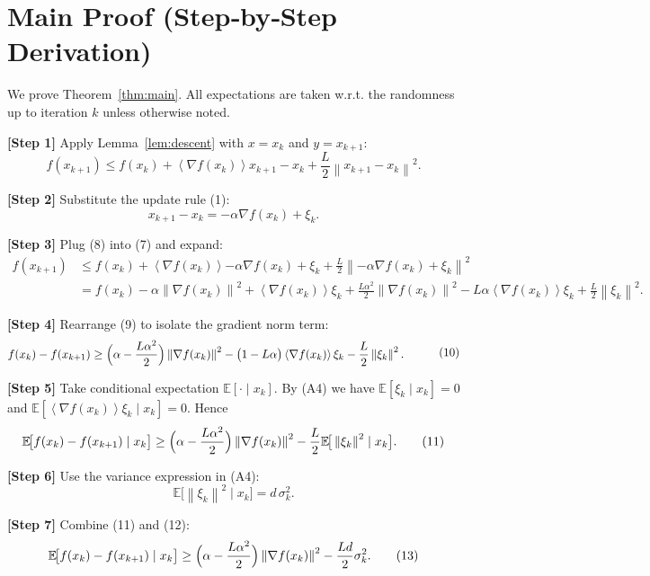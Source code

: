 \documentclass{article}
\newcommand{\E}{\mathbb{E}}
\newcommand{\norm}[1]{\left\lVert #1\right\rVert}
\newcommand{\inner}[1]{\left\langle #1\right\rangle}
\begin{document}
\section*{Main Proof (Step‑by‑Step Derivation)}
We prove Theorem~\ref{thm:main}. All expectations are taken w.r.t. the randomness up to iteration $k$ unless otherwise noted.

\noindent\textbf{[Step 1]} Apply Lemma~\ref{lem:descent} with $x=x_{k}$ and $y=x_{k+1}$:
\[
f(x_{k+1})\le f(x_{k})+\inner{\nabla f(x_{k})}{x_{k+1}-x_{k}}
+\frac{L}{2}\norm{x_{k+1}-x_{k}}^{2}.
\tag{7}
\]

\noindent\textbf{[Step 2]} Substitute the update rule (1):
\[
x_{k+1}-x_{k}= -\alpha\nabla f(x_{k})+\xi_{k}.
\tag{8}
\]

\noindent\textbf{[Step 3]} Plug (8) into (7) and expand:
\[
\begin{aligned}
f(x_{k+1})
&\le f(x_{k})
+\inner{\nabla f(x_{k})}{-\alpha\nabla f(x_{k})+\xi_{k}}
+\frac{L}{2}\norm{-\alpha\nabla f(x_{k})+\xi_{k}}^{2}\\[4pt]
&= f(x_{k})-\alpha\norm{\nabla f(x_{k})}^{2}
+\inner{\nabla f(x_{k})}{\xi_{k}}
+\frac{L\alpha^{2}}{2}\norm{\nabla f(x_{k})}^{2}
-\!L\alpha\inner{\nabla f(x_{k})}{\xi_{k}}
+\frac{L}{2}\norm{\xi_{k}}^{2}.
\end{aligned}
\tag{9}
\]

\noindent\textbf{[Step 4]} Rearrange (9) to isolate the gradient norm term:
\[
\begin{aligned}
f(x_{k})-f(x_{k+1})
&\ge \Bigl(\alpha-\frac{L\alpha^{2}}{2}\Bigr)\norm{\nabla f(x_{k})}^{2}
-\bigl(1-L\alpha\bigr)\inner{\nabla f(x_{k})}{\xi_{k}}
-\frac{L}{2}\norm{\xi_{k}}^{2}.
\end{aligned}
\tag{10}
\]

\noindent\textbf{[Step 5]} Take conditional expectation $\E[\cdot\mid x_{k}]$. By (A4) we have $\E[\xi_{k}\mid x_{k}]=0$ and $\E[\inner{\nabla f(x_{k})}{\xi_{k}}\mid x_{k}]=0$. Hence
\[
\E\!\big[f(x_{k})-f(x_{k+1})\mid x_{k}\big]
\ge \Bigl(\alpha-\frac{L\alpha^{2}}{2}\Bigr)\norm{\nabla f(x_{k})}^{2}
-\frac{L}{2}\E\!\big[\norm{\xi_{k}}^{2}\mid x_{k}\big].
\tag{11}
\]

\noindent\textbf{[Step 6]} Use the variance expression in (A4):
\[
\E\!\big[\norm{\xi_{k}}^{2}\mid x_{k}\big]=d\,\sigma_{k}^{2}.
\tag{12}
\]

\noindent\textbf{[Step 7]} Combine (11) and (12):
\[
\E\!\big[f(x_{k})-f(x_{k+1})\mid x_{k}\big]
\ge \Bigl(\alpha-\frac{L\alpha^{2}}{2}\Bigr)\norm{\nabla f(x_{k})}^{2}
-\frac{L d}{2}\sigma_{k}^{2}.
\tag{13}
\]
\end{document}
